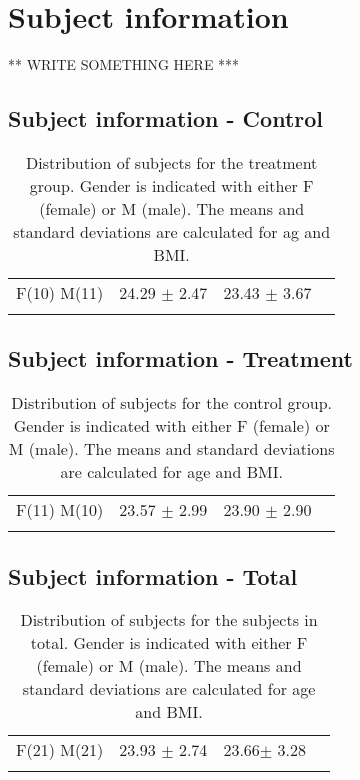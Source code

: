\section{Subject information}

** WRITE SOMETHING HERE ***

\subsection{Subject information - Control}
\begin{longtable}{l|c|c|c}
	\rowcolor[HTML]{C0C0C0} \rule{0pt}{3ex}  \color[HTML]{000000}{Gender} & \color[HTML]{000000}{Age} &  \color[HTML]{000000}{BMI} 
	\\ \hline \rule{0pt}{3ex} 
	F(10) M(11) & 24.29 $\pm$ 2.47 & 23.43 $\pm$ 3.67 
	\\ \hline 
	\caption{Distribution of subjects for the treatment group. Gender is indicated with either F (female) or M (male). The means and standard deviations are calculated for ag and BMI.}
	\label{tab:subjects}
\end{longtable}
\vspace{-.5cm}


\subsection{Subject information - Treatment}
\begin{longtable}{l|c|c|c}
	\rowcolor[HTML]{C0C0C0} \rule{0pt}{3ex}  \color[HTML]{000000}{Gender} & \color[HTML]{000000}{Age} &  \color[HTML]{000000}{BMI} 
	\\ \hline \rule{0pt}{3ex} 
	F(11) M(10) & 23.57 $\pm$ 2.99 & 23.90 $\pm$ 2.90  
	\\ \hline 
	\caption{Distribution of subjects for the control group. Gender is indicated with either F (female) or M (male). The means and standard deviations are calculated for age and BMI.}
	\label{tab:subjects}
\end{longtable}
\vspace{-.5cm}

\subsection{Subject information - Total}
\begin{longtable}{l|c|c|c}
	\rowcolor[HTML]{C0C0C0} \rule{0pt}{3ex}  \color[HTML]{000000}{Gender} & \color[HTML]{000000}{Age}  &  \color[HTML]{000000}{BMI} 
	\\ \hline \rule{0pt}{3ex} 
	F(21) M(21) & 23.93 $\pm$  2.74 & 23.66$\pm$   3.28
	\\ \hline 
	\caption{Distribution of subjects for the subjects in total. Gender is indicated with either F (female) or M (male). The means and standard deviations are calculated for age and BMI.}
	\label{tab:subjects}
\end{longtable}
\vspace{-.5cm}